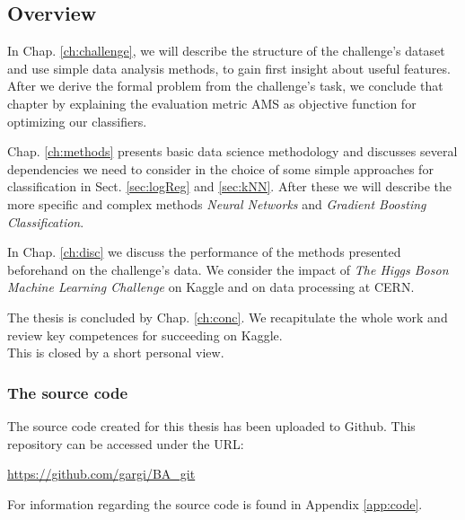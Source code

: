 \subsection{Overview}
In Chap. \ref{ch:challenge}, we will describe the structure of the challenge's dataset \cite{higgsData} and use simple data analysis methods, to gain first insight about useful features.
After we derive the formal problem from the challenge's task, we conclude that chapter by explaining the evaluation metric AMS as objective function for optimizing our classifiers. 

Chap. \ref{ch:methods} presents basic data science methodology and discusses several dependencies we need to consider in the choice of some simple approaches for classification in Sect. \ref{sec:logReg} and \ref{sec:kNN}. After these we will describe the more specific and complex methods \emph{Neural Networks} and \emph{Gradient Boosting Classification}.

In Chap. \ref{ch:disc} we discuss the performance of the methods presented beforehand on the challenge's data. We consider the impact of \emph{The Higgs Boson Machine Learning Challenge} on Kaggle and on data processing at CERN.

The thesis is concluded by Chap. \ref{ch:conc}. We recapitulate the whole work and review key competences for succeeding on Kaggle.\\
This is closed by a short personal view.

\subsubsection{The source code}
The source code created for this thesis has been uploaded to Github. This repository can be accessed under the URL:

\url{https://github.com/gargi/BA_git}

For information regarding the source code is found in Appendix \ref{app:code}.
\pagebreak
\clearpage

	{\pagebreak \thispagestyle{empty} \cleardoublepage}{\clearpage}